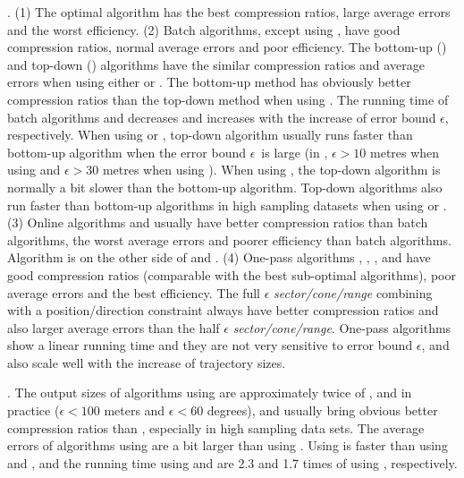 .
(1) The optimal algorithm has the best compression ratios, large average errors and the worst efficiency.
%
(2) Batch algorithms, except \dpa using \dad, have good compression ratios, normal average errors and poor efficiency.
%
The bottom-up (\tpa) and top-down (\dpa) algorithms have the similar compression ratios and average errors when using either \ped or \sed. The bottom-up method has obviously better compression ratios than the top-down method when using \dad.
%
The running time of batch algorithms \dpa and \tpa decreases and increases with the increase of error bound $\epsilon$, respectively. When using \ped or \sed, top-down algorithm \dpa usually runs faster than bottom-up algorithm \tpa when the error bound $\epsilon$~is large  (\eg in \geolife, $\epsilon >10$ metres when using \ped and $\epsilon >30$ metres when using \sed). When using \dad, the top-down algorithm is normally a bit slower than the bottom-up algorithm.
Top-down algorithms also run faster than bottom-up algorithms in high sampling datasets when using \ped or \sed.
%
(3) Online algorithms \opwa and \bqsa usually have better compression ratios than batch algorithms, the worst average errors and poorer efficiency than batch algorithms. Algorithm \squishe is on the other side of \opwa and \bqsa.
%
(4) One-pass algorithms \operb, \siped, \cised, \intersec and \interval have good compression ratios (comparable with the best sub-optimal algorithms), poor average errors and the best efficiency.
%
The full $\epsilon$ \emph{sector/cone/range} combining with a position/direction constraint always have better compression ratios and also larger average errors than the half $\epsilon$ \emph{sector/cone/range}. %
%
One-pass algorithms show a linear running time and they are not very sensitive to error bound $\epsilon$, and also scale well with the increase of trajectory sizes.



.
The output sizes of algorithms using \sed are approximately twice of \ped, and in practice (\eg $\epsilon <100$ meters and $\epsilon < 60$ degrees), \ped and \sed usually bring obvious better compression ratios than \dad, especially in high sampling data sets.
%
The average errors of algorithms using \sed are a bit larger than using \ped.
%
Using \dad is faster than using \ped and \sed, and the running time using \ped and \sed are 2.3 and 1.7 times of using \dad, respectively.



